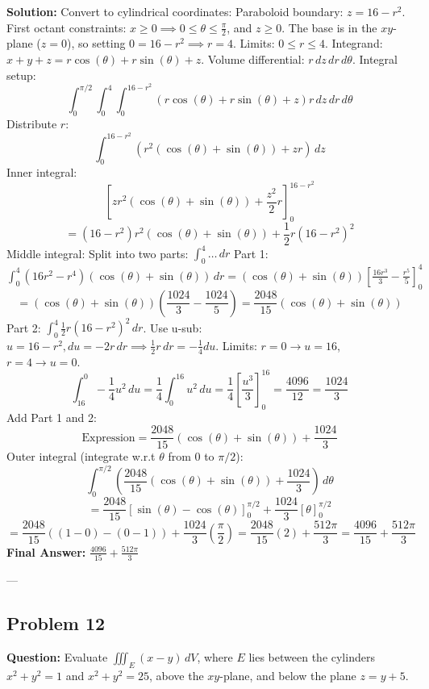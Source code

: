 \documentclass[11pt]{article}
\begin{document}
\textbf{Solution:}
Convert to cylindrical coordinates:
Paraboloid boundary: $z = 16 - r^2$.
First octant constraints: $x \geq 0 \implies 0 \leq \theta \leq \frac{\pi}{2}$, and $z \geq 0$.
The base is in the $xy$-plane ($z=0$), so setting $0 = 16 - r^2 \implies r = 4$. Limits: $0 \leq r \leq 4$.
Integrand: $x + y + z = r\cos(\theta) + r\sin(\theta) + z$.
Volume differential: $r \, dz \, dr \, d\theta$.
Integral setup:
\[ \int_0^{\pi/2} \int_0^4 \int_0^{16-r^2} (r\cos(\theta) + r\sin(\theta) + z)r \, dz \, dr \, d\theta \]
Distribute $r$:
\[ \int_0^{16-r^2} \left( r^2(\cos(\theta)+\sin(\theta)) + zr \right) \, dz \]
Inner integral:
\[ \left[ z r^2(\cos(\theta)+\sin(\theta)) + \frac{z^2}{2}r \right]_0^{16-r^2} \]
\[ = (16-r^2)r^2(\cos(\theta)+\sin(\theta)) + \frac{1}{2}r(16-r^2)^2 \]
Middle integral:
Split into two parts: $\int_0^4 \dots \, dr$
Part 1: $\int_0^4 (16r^2 - r^4)(\cos(\theta)+\sin(\theta)) \, dr = (\cos(\theta)+\sin(\theta)) \left[ \frac{16r^3}{3} - \frac{r^5}{5} \right]_0^4$
\[ = (\cos(\theta)+\sin(\theta)) \left( \frac{1024}{3} - \frac{1024}{5} \right) = \frac{2048}{15}(\cos(\theta)+\sin(\theta)) \]
Part 2: $\int_0^4 \frac{1}{2}r(16-r^2)^2 \, dr$. Use u-sub: $u = 16-r^2, du = -2r \, dr \implies \frac{1}{2}r \, dr = -\frac{1}{4}du$.
Limits: $r=0 \to u=16$, $r=4 \to u=0$.
\[ \int_{16}^0 -\frac{1}{4}u^2 \, du = \frac{1}{4} \int_0^{16} u^2 \, du = \frac{1}{4} \left[ \frac{u^3}{3} \right]_0^{16} = \frac{4096}{12} = \frac{1024}{3} \]
Add Part 1 and 2:
\[ \text{Expression} = \frac{2048}{15}(\cos(\theta)+\sin(\theta)) + \frac{1024}{3} \]
Outer integral (integrate w.r.t $\theta$ from $0$ to $\pi/2$):
\[ \int_0^{\pi/2} \left( \frac{2048}{15}(\cos(\theta)+\sin(\theta)) + \frac{1024}{3} \right) \, d\theta \]
\[ = \frac{2048}{15} \left[ \sin(\theta) - \cos(\theta) \right]_0^{\pi/2} + \frac{1024}{3} [\theta]_0^{\pi/2} \]
\[ = \frac{2048}{15} ((1 - 0) - (0 - 1)) + \frac{1024}{3} \left(\frac{\pi}{2}\right) = \frac{2048}{15}(2) + \frac{512\pi}{3} = \frac{4096}{15} + \frac{512\pi}{3} \]
\textbf{Final Answer:} $\frac{4096}{15} + \frac{512\pi}{3}$

---

\subsection*{Problem 12}
\textbf{Question:} Evaluate $\iiint_E (x - y) \, dV$, where $E$ lies between the cylinders $x^2 + y^2 = 1$ and $x^2 + y^2 = 25$, above the $xy$-plane, and below the plane $z = y + 5$.
\end{document}
